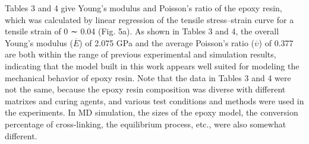 \documentclass{article}
\begin{document}
Tables 3 and 4 give Young’s modulus and Poisson’s ratio of the epoxy resin, which was calculated by linear regression of the tensile stress–strain curve for a tensile strain of 0 ∼ 0.04 (Fig. 5a). As shown in Tables 3 and 4, the overall Young’s modulus ($\overline{E}$) of 2.075 GPa and the average Poisson’s ratio ($\overline{\upsilon}$) of 0.377 are both within the range of previous experimental and simulation results, indicating that the model built in this work appears well suited for modeling the mechanical behavior of epoxy resin. Note that the data in Tables 3 and 4 were not the same, because the epoxy resin composition was diverse with different matrixes and curing agents, and various test conditions and methods were used in the experiments. In MD simulation, the sizes of the epoxy model, the conversion percentage of cross-linking, the equilibrium process, etc., were also somewhat different.
\end{document}
